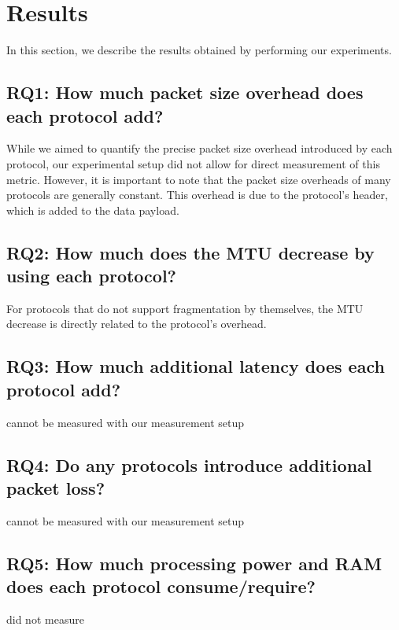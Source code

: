
\chapter{Results}
\label{chap:results}

In this section, we describe the results obtained by performing our
experiments.


\section{RQ1: How much packet size overhead does each protocol add?}
While we aimed to quantify the precise packet size overhead introduced by each protocol, our experimental setup did not allow for direct measurement of this metric.
However, it is important to note that the packet size overheads of many protocols are generally constant.
This overhead is due to the protocol's header, which is added to the data payload.

\section{RQ2: How much does the MTU decrease by using each protocol?}
For protocols that do not support fragmentation by themselves, the MTU decrease is directly related to the protocol's overhead.

\section{RQ3: How much additional latency does each protocol add?}
cannot be measured with our measurement setup

\section{RQ4: Do any protocols introduce additional packet loss?}
cannot be measured with our measurement setup

\section{RQ5: How much processing power and RAM does each protocol consume/require?}
did not measure

